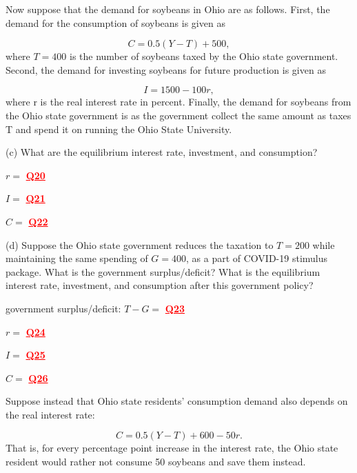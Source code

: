 \documentclass[14pt]{extarticle}
\newcommand{\red}[1]{\textcolor{red}{#1}}
\begin{document}
Now suppose that the demand for soybeans in Ohio are as follows. First, the demand for the consumption of soybeans is given as

%
\begin{equation}
\label{eq:demand}
    C = 0.5( Y - T ) + 500
,\end{equation}
%
where $T = 400$ is the number of soybeans taxed by the Ohio state government. Second, the demand for investing soybeans for future production is given as

%
\begin{equation}
\label{eq:investment}
    I = 1500 - 100r
,\end{equation}
%
where r is the real interest rate in percent. Finally, the demand for soybeans from the Ohio state government is  as the government collect the same amount as taxes T and spend it on running the Ohio State University.

(c) What are the equilibrium interest rate, investment, and consumption?

\begin{center}
    $ r =  $   \textbf{\red{\underline{\quad Q20 \quad}}}

    $ I =  $   \textbf{\red{\underline{\quad Q21 \quad}}}

    $ C =  $   \textbf{\red{\underline{\quad Q22 \quad}}}
\end{center}


(d) Suppose the Ohio state government reduces the taxation to $ T = 200 $ while maintaining the same spending of $ G = 400 $, as a part of COVID-19 stimulus package.
What is the government surplus/deficit? What is the equilibrium interest rate, investment, and consumption after this government policy?

\begin{center}
    government surplus/deficit: $ T - G = $ \textbf{\red{\underline{\quad Q23 \quad}}}

    $ r =  $   \textbf{\red{\underline{\quad Q24 \quad}}}

    $ I =  $   \textbf{\red{\underline{\quad Q25 \quad}}}

    $ C =  $   \textbf{\red{\underline{\quad Q26 \quad}}}
\end{center}


Suppose instead that Ohio state residents' consumption demand also depends on the real interest rate:

%
\begin{equation}
\label{eq:demand_interestrate}
    C = 0.5 ( Y-T ) + 600 - 50r
.\end{equation}
%
That is, for every percentage point increase in the interest rate, the Ohio state resident would rather not consume 50 soybeans and save them instead.
\end{document}
